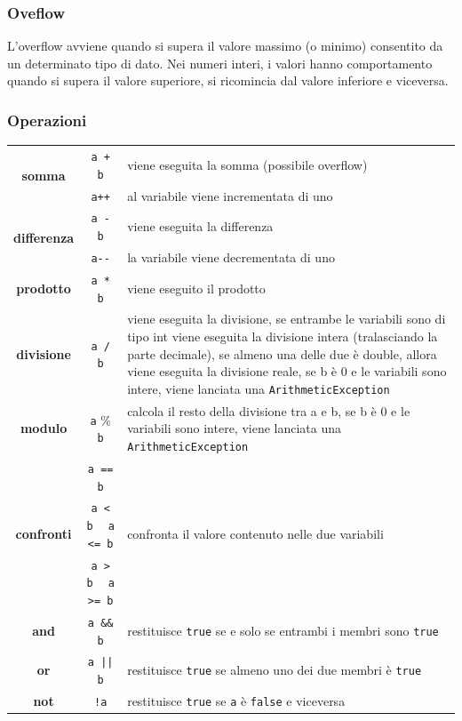 \documentclass[a4paper]{article}
\begin{document}
\subsubsection*{Oveflow}
L'overflow avviene quando si supera il valore massimo (o minimo) consentito da un determinato tipo di dato. Nei numeri
interi, i valori hanno comportamento  quando si supera il valore superiore, si ricomincia dal valore inferiore 
e viceversa.

\subsubsection*{Operazioni}
\begin{center}
	\begin{tabularx}{\textwidth}{c c X}		
		\multirow{2}{*}{\textbf{somma}}
		& \verb|a + b| & viene eseguita la somma (possibile overflow) \\
		& \verb|a++| & al variabile viene incrementata di uno \\
		\midrule

		\multirow{2}{*}{\textbf{differenza}}
		& \verb|a - b| & viene eseguita la differenza \\
		& \verb|a--| & la variabile viene decrementata di uno \\
		\midrule
		
		\textbf{prodotto}
		& \verb|a * b| & viene eseguito il prodotto \\
		\midrule
		
		\textbf{divisione}
		& \verb|a / b| & viene eseguita la divisione, se entrambe le variabili sono di tipo int viene eseguita la divisione
		intera (tralasciando la parte decimale), se almeno una delle due è double, allora viene eseguita la divisione reale,
		se b è 0 e le variabili sono intere, viene lanciata una \verb|ArithmeticException| \\
		\midrule
		
		\textbf{modulo}
		& \verb|a| \% \verb|b| & calcola il resto della divisione tra a e b, se b è 0 e le variabili sono intere, viene
		lanciata una \verb|ArithmeticException| \\
		\midrule
		
		\multirow{3}{*}{\textbf{confronti}}
		& \verb|a == b| & \multirow{3}{*}{confronta il valore contenuto nelle due variabili} \\
		& \verb|a < b| \(\;\;\) \verb|a <= b| & \\
		& \verb|a > b| \(\;\;\) \verb|a >= b| & \\
		\midrule

		\textbf{and}
		& \verb|a && b| & restituisce \verb|true| se e solo se entrambi i membri sono \verb|true| \\
		\midrule

		\textbf{or}
		& \verb=a || b= & restituisce \verb|true| se almeno uno dei due membri è \verb|true| \\
		\midrule

		\textbf{not}
		& \verb|!a| & restituisce \verb|true| se \verb|a| è \verb|false| e viceversa
	\end{tabularx}
\end{center}
\end{document}
